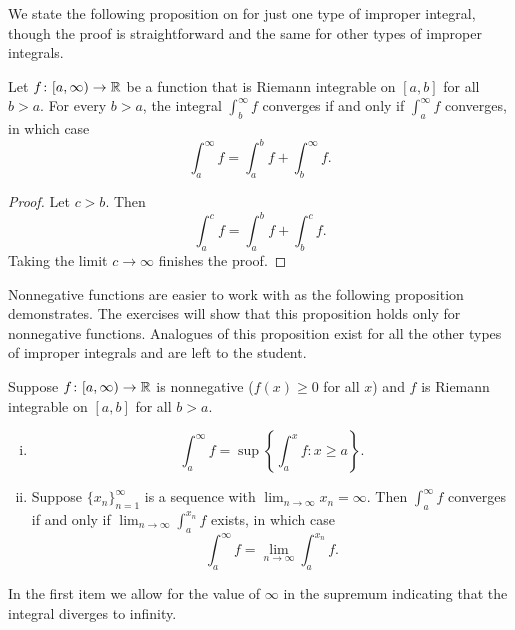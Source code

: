 We state the following proposition on  for just one type
of improper integral, though the proof is straightforward
and the same for other types of improper integrals.

\begin{prop} \label{impropriemann:tail}
Let $f \colon [a,\infty) \to {\mathbb{R}}$ be a function
that is Riemann integrable on $[a,b]$ for all $b > a$.
For every $b > a$, the integral
$\int_b^\infty f$ converges if and only if $\int_a^\infty f$
converges, in which case
\begin{equation*}
\int_a^\infty f
=
\int_a^b f +
\int_b^\infty f .
\end{equation*}
\end{prop}

\begin{proof}
Let $c > b$.  Then
\begin{equation*}
\int_a^c f
=
\int_a^b f +
\int_b^c f .
\end{equation*}
Taking the limit $c \to \infty$ finishes the proof.
\end{proof}

Nonnegative functions are easier to work with
as the following proposition demonstrates.
The exercises will show that this proposition
holds only for nonnegative functions.
Analogues of this proposition
exist for all the other types of improper integrals and are left to the
student.

\begin{prop} \label{impropriemann:possimp}
Suppose $f \colon [a,\infty) \to {\mathbb{R}}$ is nonnegative ($f(x)
\geq 0$ for all $x$) and
$f$ is Riemann integrable on $[a,b]$ for all $b > a$.
\begin{enumerate}[(i)]
\item 
\begin{equation*}
\int_a^\infty f = \sup \left\{ \int_a^x f : x \geq a \right\} .
\end{equation*}
\item
Suppose $\{ x_n \}_{n=1}^\infty$
is a sequence with $\lim_{n\to\infty} x_n = \infty$.  Then
$\int_a^\infty f$ converges if and only if $\lim_{n\to\infty} \int_a^{x_n} f$ exists, in
which case
\begin{equation*}
\int_a^\infty f = \lim_{n\to\infty} \int_a^{x_n} f .
\end{equation*}
\end{enumerate}
\end{prop}

In the first item we allow for the value of $\infty$ in the
supremum indicating that the integral diverges to infinity.

